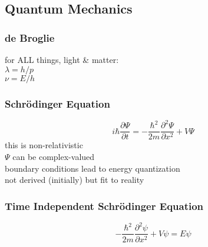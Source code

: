 \documentclass[letterpaper,landscape,10pt]{article}
\begin{document}
{\begin{multicols}{4}
%
\section*{Quantum Mechanics}
  \subsubsection*{de Broglie}
	\hspace{5pt}for ALL things, light \& matter: \\
	\hspace{15pt}$\lambda=h/p$ \\
	\hspace{15pt}$\nu=E/h$
  \subsubsection*{Schr\"odinger Equation}
  	$$ i\hbar\frac{\partial\Psi}{\partial t} = -\frac{\hbar^2}{2m}\frac{\partial^2\Psi}{\partial x^2} + V\Psi$$
	\hspace{5pt}this is non-relativistic\\
	\hspace{5pt}$\Psi$ can be complex-valued\\
	\hspace{5pt}boundary conditions lead to energy quantization\\
	\hspace{5pt}not derived (initially) but fit to reality\\
  \subsubsection*{Time Independent Schr\"odinger Equation}
  	$$ -\frac{\hbar^2}{2m}\frac{\partial^2\psi}{\partial x^2} + V\psi = E\psi$$

\end{multicols}}
\end{document}
